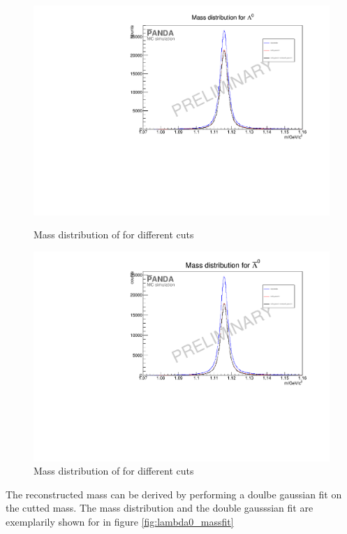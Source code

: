 		\begin{figure}
			\centering
				\includegraphics[width=1.1\textwidth]{./plots/lambda0/lambda0_m_diffcuts.pdf}
			\caption{Mass distribution of \lam for different cuts}
			\label{fig:lambda0_massdiffcuts}
			
				\includegraphics[width=1.1\textwidth]{./plots/antilambda0/antiLambda0_m_diffcuts.pdf}
			\caption{Mass distribution of \alam for different cuts}
			\label{fig:antilambda0_massdiffcuts}
		\end{figure}
		
		The reconstructed mass can be derived by performing a doulbe gaussian fit on the cutted mass.
		The mass distribution and the double gausssian fit are exemplarily shown for \lam in figure \ref{fig:lambda0_massfit}
		

